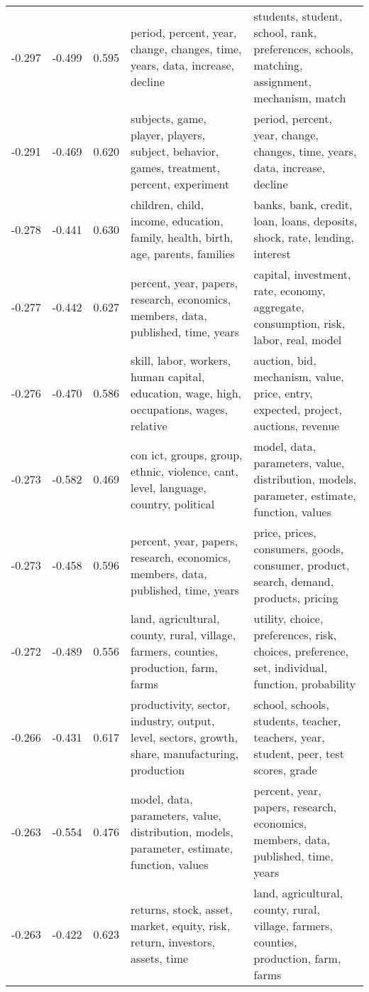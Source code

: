 \begin{tabular}{cccp{5cm}p{5cm}}
-0.297 & -0.499 & 0.595 & period, percent, year, change, changes, time, years, data, increase, decline & students, student, school, rank, preferences, schools, matching, assignment, mechanism, match \\
-0.291 & -0.469 & 0.620 & subjects, game, player, players, subject, behavior, games, treatment, percent, experiment & period, percent, year, change, changes, time, years, data, increase, decline \\
-0.278 & -0.441 & 0.630 & children, child, income, education, family, health, birth, age, parents, families & banks, bank, credit, loan, loans, deposits, shock, rate, lending, interest \\
-0.277 & -0.442 & 0.627 & percent, year, papers, research, economics, members, data, published, time, years & capital, investment, rate, economy, aggregate, consumption, risk, labor, real, model \\
-0.276 & -0.470 & 0.586 & skill, labor, workers, human capital, education, wage, high, occupations, wages, relative & auction, bid, mechanism, value, price, entry, expected, project, auctions, revenue \\
-0.273 & -0.582 & 0.469 & con ict, groups, group, ethnic, violence, cant, level, language, country, political & model, data, parameters, value, distribution, models, parameter, estimate, function, values \\
-0.273 & -0.458 & 0.596 & percent, year, papers, research, economics, members, data, published, time, years & price, prices, consumers, goods, consumer, product, search, demand, products, pricing \\
-0.272 & -0.489 & 0.556 & land, agricultural, county, rural, village, farmers, counties, production, farm, farms & utility, choice, preferences, risk, choices, preference, set, individual, function, probability \\
-0.266 & -0.431 & 0.617 & productivity, sector, industry, output, level, sectors, growth, share, manufacturing, production & school, schools, students, teacher, teachers, year, student, peer, test scores, grade \\
-0.263 & -0.554 & 0.476 & model, data, parameters, value, distribution, models, parameter, estimate, function, values & percent, year, papers, research, economics, members, data, published, time, years \\
-0.263 & -0.422 & 0.623 & returns, stock, asset, market, equity, risk, return, investors, assets, time & land, agricultural, county, rural, village, farmers, counties, production, farm, farms \\

\end{tabular}
